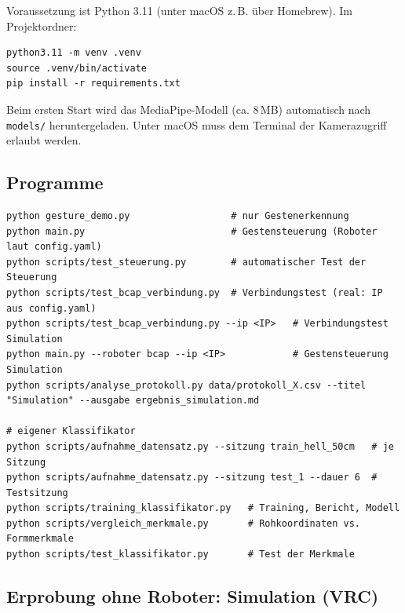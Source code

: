 \documentclass[11pt,a4paper]{article}
\newcommand{\datei}[1]{\texttt{#1}}
\begin{document}
Voraussetzung ist Python 3.11 (unter macOS z.\,B. über Homebrew). Im Projektordner:
\begin{lstlisting}
python3.11 -m venv .venv
source .venv/bin/activate
pip install -r requirements.txt
\end{lstlisting}
Beim ersten Start wird das MediaPipe-Modell (ca. 8\,MB) automatisch nach \datei{models/}
heruntergeladen. Unter macOS muss dem Terminal der Kamerazugriff erlaubt werden.

\subsection{Programme}

\begin{lstlisting}
python gesture_demo.py                  # nur Gestenerkennung
python main.py                          # Gestensteuerung (Roboter laut config.yaml)
python scripts/test_steuerung.py        # automatischer Test der Steuerung
python scripts/test_bcap_verbindung.py  # Verbindungstest (real: IP aus config.yaml)
python scripts/test_bcap_verbindung.py --ip <IP>   # Verbindungstest Simulation
python main.py --roboter bcap --ip <IP>            # Gestensteuerung Simulation
python scripts/analyse_protokoll.py data/protokoll_X.csv --titel "Simulation" --ausgabe ergebnis_simulation.md

# eigener Klassifikator
python scripts/aufnahme_datensatz.py --sitzung train_hell_50cm   # je Sitzung
python scripts/aufnahme_datensatz.py --sitzung test_1 --dauer 6  # Testsitzung
python scripts/training_klassifikator.py   # Training, Bericht, Modell
python scripts/vergleich_merkmale.py       # Rohkoordinaten vs. Formmerkmale
python scripts/test_klassifikator.py       # Test der Merkmale
\end{lstlisting}

\subsection{Erprobung ohne Roboter: Simulation (VRC)}
\end{document}
